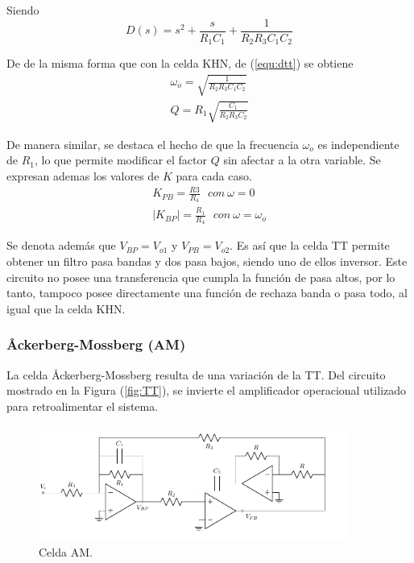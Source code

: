 Siendo
\begin{equation}
	D(s) = s^2 + \frac{s}{R_1 C_1} + \frac{1}{R_2 R_3 C_1 C_2}
	\label{equ:dtt}
\end{equation}

De de la misma forma que con la celda KHN, de (\ref{equ:dtt}) se obtiene
\begin{equation}
\begin{split}
	\omega_o = \sqrt{\frac{1}{R_2 R_3 C_1 C_2}} \\
	Q = R_1 \sqrt{\frac{C_1}{R_2 R_3 C_2}} 
\end{split}
\end{equation}

De manera similar, se destaca el hecho de que la frecuencia $\omega_o$ es independiente de $R_1$, lo que permite modificar el factor $Q$ sin afectar a la otra variable. Se expresan ademas los valores de $K$ para cada caso.
\begin{equation}
\begin{split}
	K_{PB} = \frac{R3}{R_4}	\	\	\ con \ \omega = 0 \\
	|K_{BP}| = \frac{R_1}{R_4}	\	\	\ con \ \omega = \omega_o
\end{split}
\end{equation}

Se denota además que $V_{BP} = V_{o1}$ y $V_{PB} = V_{o2}$. Es así que la celda TT permite obtener un filtro pasa bandas y dos pasa bajos, siendo uno de ellos inversor. Este circuito no posee una transferencia que cumpla la función de pasa altos, por lo tanto, tampoco posee directamente una función de rechaza banda o pasa todo, al igual que la celda KHN.

\subsubsection{\r{A}ckerberg-Mossberg (AM)}
La celda \r{A}ckerberg-Mossberg resulta de una variación de la TT. Del circuito mostrado en la Figura (\ref{fig:TT}), se invierte el amplificador operacional utilizado para retroalimentar el sistema.
\begin{figure}[H]
\centering
	\includegraphics[width=0.9\textwidth]{ImagenesEjercicio4/AM.pdf}
	\caption{Celda AM.}
	\label{fig:AM}
\end{figure}

